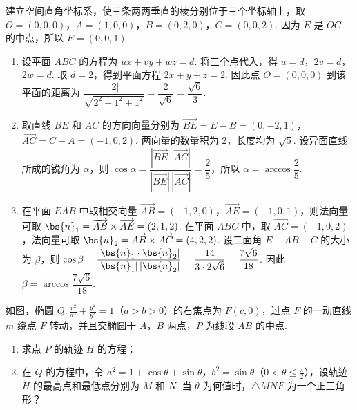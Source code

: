 \begin{solution}
建立空间直角坐标系，使三条两两垂直的棱分别位于三个坐标轴上，取 \(O=(0,0,0)\)，\(A=(1,0,0)\)，\(B=(0,2,0)\)，\(C=(0,0,2)\). 因为 \(E\) 是 \(OC\) 的中点，所以 \(E=(0,0,1)\).

\begin{enumerate}
\item 设平面 \(ABC\) 的方程为 \(ux+vy+wz=d\). 将三个点代入，得 \(u=d\)，\(2v=d\)，\(2w=d\). 取 \(d=2\)，得到平面方程 \(2x+y+z=2\). 因此点 \(O=(0,0,0)\) 到该平面的距离为 \(\dfrac{|2|}{\sqrt{2^2+1^2+1^2}}=\dfrac{2}{\sqrt6}=\dfrac{\sqrt6}{3}\).
\item 取直线 \(BE\) 和 \(AC\) 的方向向量分别为 \(\overrightarrow{BE}=E-B=(0,-2,1)\)，\(\overrightarrow{AC}=C-A=(-1,0,2)\). 两向量的数量积为 \(2\)，长度均为 \(\sqrt5\). 设异面直线所成的锐角为 \(\alpha\)，则 \(\cos\alpha=\dfrac{|\overrightarrow{BE}\cdot\overrightarrow{AC}|}{|\overrightarrow{BE}|\,|\overrightarrow{AC}|}=\dfrac25\)，所以 \(\alpha=\arccos\dfrac25\).
\item 在平面 \(EAB\) 中取相交向量 \(\overrightarrow{AB}=(-1,2,0)\)，\(\overrightarrow{AE}=(-1,0,1)\)，则法向量可取 \(\bs{n}_1=\overrightarrow{AB}\times\overrightarrow{AE}=(2,1,2)\). 在平面 \(ABC\) 中，取 \(\overrightarrow{AC}=(-1,0,2)\)，法向量可取 \(\bs{n}_2=\overrightarrow{AB}\times\overrightarrow{AC}=(4,2,2)\). 设二面角 \(E-AB-C\) 的大小为 \(\beta\)，则
\(\cos\beta=\dfrac{|\bs{n}_1\cdot\bs{n}_2|}{|\bs{n}_1|\,|\bs{n}_2|}=\dfrac{14}{3\cdot2\sqrt6}=\dfrac{7\sqrt6}{18}\). 因此 \(\beta=\arccos\dfrac{7\sqrt6}{18}\).
\end{enumerate}
\end{solution}

\begin{problem}
如图，椭圆 \(Q: \frac{x^2}{a^2} + \frac{y^2}{b^2} = 1\)（\(a > b > 0\)）的右焦点为 \(F(c, 0)\)，过点 \(F\) 的一动直线 \(m\) 绕点 \(F\) 转动，并且交椭圆于 \(A\)，\(B\) 两点，\(P\) 为线段 \(AB\) 的中点.

\begin{enumerate}
\item 求点 \(P\) 的轨迹 \(H\) 的方程；
\item 在 \(Q\) 的方程中，令 \(a^2 = 1 + \cos \theta + \sin \theta\)，\(b^2 = \sin \theta\)（\(0 < \theta \leqslant \frac{\pi}{2}\)），设轨迹 \(H\) 的最高点和最低点分别为 \(M\) 和 \(N\). 当 \(\theta\) 为何值时，\(\triangle MNF\) 为一个正三角形？
\end{enumerate}

\end{problem}

